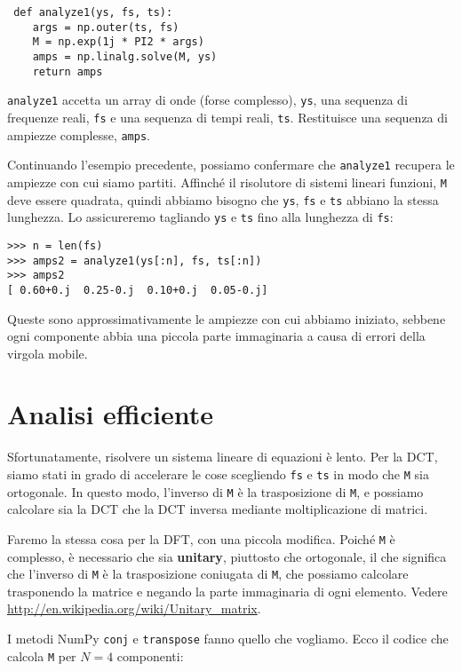 \documentclass[12pt,a4paper]{book}
\begin{document}
\begin{verbatim} def analyze1(ys, fs, ts):
    args = np.outer(ts, fs)
    M = np.exp(1j * PI2 * args)
    amps = np.linalg.solve(M, ys)
    return amps
 \end{verbatim} 

{\tt analyze1} accetta un array di onde (forse complesso), {\tt ys}, una sequenza di frequenze reali, {\tt fs} e una sequenza di tempi reali, {\tt ts}. Restituisce una sequenza di ampiezze complesse, {\tt amps}.

Continuando l'esempio precedente, possiamo confermare che {\tt analyze1} recupera le ampiezze con cui siamo partiti. Affinché il risolutore di sistemi lineari funzioni, {\tt M} deve essere quadrata, quindi abbiamo bisogno che {\tt ys}, {\tt fs} e {\tt ts} abbiano la stessa lunghezza. Lo assicureremo tagliando {\tt ys} e {\tt ts} fino alla lunghezza di {\tt fs}:

\begin{verbatim} 
>>> n = len(fs)
>>> amps2 = analyze1(ys[:n], fs, ts[:n])
>>> amps2
[ 0.60+0.j  0.25-0.j  0.10+0.j  0.05-0.j]
 \end{verbatim} 

Queste sono approssimativamente le ampiezze con cui abbiamo iniziato, sebbene ogni componente abbia una piccola parte immaginaria a causa di errori della virgola mobile.

\section{Analisi efficiente} 

Sfortunatamente, risolvere un sistema lineare di equazioni è lento. Per la DCT, siamo stati in grado di accelerare le cose scegliendo {\tt fs} e {\tt ts} in modo che {\tt M} sia ortogonale. In questo modo, l'inverso di {\tt M} è la trasposizione di {\tt M}, e possiamo calcolare sia la DCT che la DCT inversa mediante moltiplicazione di matrici.

Faremo la stessa cosa per la DFT, con una piccola modifica. Poiché {\tt M} è complesso, è necessario che sia {\bf unitary}, piuttosto che ortogonale, il che significa che l'inverso di {\tt M} è la trasposizione coniugata di {\tt M}, che possiamo calcolare trasponendo la matrice e negando la parte immaginaria di ogni elemento. Vedere \url{http://en.wikipedia.org/wiki/Unitary_matrix}.

I metodi NumPy {\tt conj} e {\tt transpose} fanno quello che vogliamo. Ecco il codice che calcola {\tt M} per $N=4$ componenti:
\end{document}
